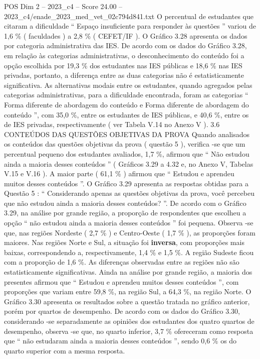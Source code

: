 \begin{textsample}{POS Dim 2 – 2023\_c4 – Score 24.00 – 2023\_c4/enade\_2023\_med\_vet\_02c794d841.txt}
O percentual de estudantes que citaram a dificuldade “ Espaço insuficiente para responder às questões ” variou de 1,6 \% ( faculdades ) a 2,8 \% ( CEFET/IF ).
O Gráfico 3.28 apresenta os dados por categoria administrativa das IES.
De acordo com os dados do Gráfico 3.28, em relação às categorias administrativas, o desconhecimento do conteúdo foi a opção escolhida por 19,3 \% dos estudantes nas IES públicas e 18,6 \% nas IES privadas, portanto, a diferença entre as duas categorias não é estatisticamente significativa.
As alternativas modais entre os estudantes, quando agregados pelas categorias administrativas, para a dificuldade encontrada, foram as categorias “ Forma diferente de abordagem do conteúdo e Forma diferente de abordagem do conteúdo ”, com 35,0 \%, entre os estudantes de IES públicas, e 40,6 \%, entre os de IES privadas, respectivamente ( ver Tabela V.14 no Anexo V ). 3.6 CONTEÚDOS DAS QUESTÕES OBJETIVAS DA PROVA Quando analisados os conteúdos das questões objetivas da prova ( questão 5 ), verifica -se que um percentual pequeno dos estudantes avaliados, 1,7 \%, afirmou que “ Não estudou ainda a maioria desses conteúdos ” ( Gráficos 3.29 a 4.32 e, no Anexo V, Tabelas V.15 e V.16 ).
A maior parte ( 61,1 \% ) afirmou que “ Estudou e aprendeu muitos desses conteúdos ”.
O Gráfico 3.29 apresenta as respostas obtidas para a Questão 5 : “ Considerando apenas as questões objetivas da prova, você percebeu que não estudou ainda a maioria desses conteúdos? ”.
De acordo com o Gráfico 3.29, na análise por grande região, a proporção de respondentes que escolheu a opção “ não estudou ainda a maioria desses conteúdos ” foi pequena.
Observa -se que, nas regiões Nordeste ( 2,7 \% ) e Centro-Oeste ( 1,7 \% ), as proporções foram maiores.
Nas regiões Norte e Sul, a situação foi \textbf{inversa}, com proporções mais baixas, correspondendo a, respectivamente, 1,4 \% e 1,5 \%.
A região Sudeste ficou com a proporção de 1,6 \%.
As diferenças observadas entre as regiões não são estatisticamente significativas.
Ainda na análise por grande região, a maioria dos presentes afirmou que “ Estudou e aprendeu muitos desses conteúdos ”, com proporções que variam entre 59,8 \%, na região Sul, a 64,3 \%, na região Norte.
O Gráfico 3.30 apresenta os resultados sobre a questão tratada no gráfico anterior, porém por quartos de desempenho.
De acordo com os dados do Gráfico 3.30, considerando -se separadamente as opiniões dos estudantes dos quatro quartos de desempenho, observa -se que, no quarto inferior, 3,7 \% ofereceram como resposta que “ não estudaram ainda a maioria desses conteúdos ”, sendo 0,6 \% os do quarto superior com a mesma resposta.

\end{textsample}
